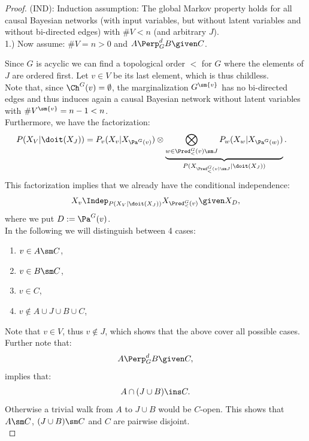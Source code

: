 \begin{Thm}
\begin{proof}
(IND): Induction assumption: 
The global Markov property holds for all causal Bayesian networks 
(with input variables, but without latent variables and without bi-directed edges) 
with $\#V < n$ (and arbitrary $J$).\\

1.) Now assume: $\#V =n>0$ and $A \Perp^d_G B \given C$.

Since $G$ is acyclic we can find a topological order $<$ for $G$ where the elements of $J$ are ordered first.  
Let $v \in V$ be its last element, which is thus  childless.  \\
Note that, since $\Ch^G(v) = \emptyset$, the marginalization $G^{\sm \{v\}}$ has no bi-directed edges and thus induces again 
a causal Bayesian network without latent variables with $\#V^{\sm \{v\}}=n-1 <n$.\\
Furthermore, we have the factorization:
\begin{align*} 
    P(X_V|\doit(X_J)) 
        &= P_v(X_v|X_{\Pa^G(v)}) \otimes 
    \underbrace{\bigotimes_{w \in \Pred^G_<(v) \sm J} P_w(X_w|X_{\Pa^G(w)})}_{P(X_{\Pred_<^G(v) \sm J}|\doit(X_J))}.
\end{align*}
This factorization implies that we already have the conditional independence:
\begin{align*}
    X_v \Indep_{P(X_V|\doit(X_J)) } X_{\Pred^G_<(v)} \given X_D,     \label{eq:pred}
\end{align*}
where we put $D:=\Pa^{G}(v)$.\\

In the following we will distinguish between 4 cases: 
\begin{enumerate}[label = \Alph*.)]
    \item $v \in A \sm C$,
    \item $v \in B \sm C$,
    \item $v \in C$,
    \item $ v \notin A \cup J \cup B \cup C$,
\end{enumerate}
Note that $v \in V$, thus $v \notin J$, which shows that the above cover all possible cases.\\
Further note that:
\[A \Perp^d_G  B \given C,\] 
implies that:
\[ A \cap ( J \cup B) \ins C.  \]
Otherwise a trivial walk from $A$ to $J \cup B$ would be $C$-open. 
This shows that $A\sm C$, $(J \cup B) \sm C$ and $C$ are pairwise disjoint.\\



\end{proof}
\end{Thm}
